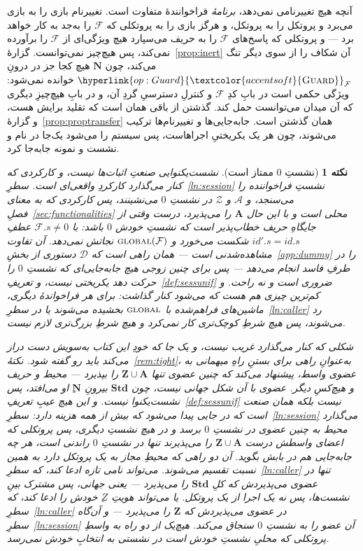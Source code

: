 \documentclass[10pt,oneside,openany]{book}
\newcommand{\admits}{\mathbf{N}}
\newcommand{\Apid}{\mathbf{A}}
\newcommand{\Zpid}{\mathbf{Z}}
\newcommand{\Stdpid}{\mathbf{Std}}
\newcommand{\F}{\mathcal{F}}
\newcommand{\Zenv}{\mathcal{Z}}
\newcommand{\Adv}{\mathcal{A}}
\newcommand{\Dum}{\mathcal{D}}
\newcommand{\op}[1]{\textnormal{\textsc{#1}}}
\newcommand{\opl}[1]{\hyperlink{op:#1}{\textcolor{accentsoft}{\op{#1}}}}
\newcommand{\id}{id}
\theoremstyle{accentdef}
\newtheorem{remark}[definition]{نکته}
\theoremstyle{accentplain}
\begin{document}
آنچه هیچ تغییرنامی نمی‌دهد، \emph{برنامهٔ} فراخوانندهٔ متفاوت است. تغییرنام
بازی را به بازی می‌برد و پروتکل را به پروتکل، و هرگز بازی را به پروتکلی که
$\F$ را به‌جد به کار خواهد برد --- و پروتکلی که پاسخ‌های $\F$ را به حریف
می‌سپارد هیچ ویژگی‌ای از $\F$ را برآورده نمی‌کند، پس هیچ‌چیز نمی‌توانست.
گزارهٔ~\ref{prop:inert} آن شکاف را از سوی دیگر تنگ می‌کند، چون $\admits$
هیچ کجا جز در درونِ $\opl{Guard}_{\F}$ خوانده نمی‌شود: ویژگی حکمی است در
بابِ کدِ $\F$ و کنترلِ دسترسیِ گردِ آن، و در بابِ هیچ‌چیزِ دیگری که آن میدان
می‌توانست حمل کند. گذشتن از باقی همان است که تقلید برایش هست، و
گزارهٔ~\ref{prop:proptransfer} همان گذشتن است. جابه‌جایی‌ها و تغییرنام‌ها
ترکیب می‌شوند، چون هر یک یکریختیِ اجراهاست، پس سیستم را می‌شود یک‌جا در
نام و نشست و نمونه جابه‌جا کرد.

\begin{remark}[نشستِ $0$ ممتاز است]\label{rem:sesszero}
نشست‌یکنوایی صنعتِ اثبات‌ها نیست، و کارکردی که کنار می‌گذارد کارکردِ
واقعی‌ای است. سطرِ~\ref{ln:session} نشستِ \emph{فراخواننده} را می‌سنجد، و
$\Adv$ و $\Zenv$ در نشستِ $0$ می‌نشینند، پس کارکردی که به معنای
فصلِ~\ref{sec:functionalities} \emph{محلی} است و با این حال $\Apid$ را
می‌پذیرد، درست وقتی از جایگاهِ حریف خطاب‌پذیر است که نشستِ خودش $0$ باشد: با
$\F.s \neq 0$ عطفِ $\id'.s = \id.s$ شکست می‌خورد و $\op{global}(\F)$
نجاتش نمی‌دهد. آن تفاوت مشاهده‌شدنی است --- همان راهی است که $\Dum$ دستوری
از بخشِ~\ref{app:dummy} را در طرفِ فاسد انجام می‌دهد --- پس برای چنین زوجی
هیچ جابه‌جایی‌ای که نشستِ $0$ را حرکت دهد یکریختی نیست، و
تعریفِ~\ref{def:sessunif} ضروری است و نه راحت. و کم‌ترین چیزی هم هست که
می‌شود کنار گذاشت: برای هر فراخواندهٔ دیگری، ماشین‌های فراهم‌شده با
$\op{global}$ بخشیده می‌شوند یا در سطرِ~\ref{ln:caller} رد می‌شوند، پس هیچ
شرطِ کوچک‌تری کار نمی‌کرد و هیچ شرطِ بزرگ‌تری لازم نیست.

شکلی که کنار می‌گذارد غریب نیست، و یک جا که خودِ این کتاب به‌سویش دست دراز
می‌کند باید رو گفته شود. نکتهٔ~\ref{rem:tight}، به‌عنوانِ راهی برای بستنِ
راهِ میهمانی به عضوی \emph{واسط}، پیشنهاد می‌کند که چنین عضوی تنها $\Zpid
\cup \Apid$ را بپذیرد --- محیط و حریف و هیچ‌کسِ دیگر. عضوی با آن شکل جهانی
نیست، چون $\Stdpid$ بیرونِ $\admits$ِ او می‌افتد، پس نشست‌یکنوا نیست. و این
هیچ عیبِ تعریفِ~\ref{def:sessunif} نیست بلکه همان صنعت است که در جایی
پیدا می‌شود که بیش از همه هزینه دارد: سطرِ~\ref{ln:session} می‌گذارد محیط
به چنین عضوی در نشستِ $0$ برسد و در هیچ نشستِ دیگری، پس پروتکلی که اعضای
واسطش درست $\Zpid \cup \Apid$ را می‌پذیرند تنها در نشستِ $0$ راندنی است، هر
چه جابه‌جایی هم در بابش بگوید. آن دو راهی که محیطِ مجاز به یک پروتکل دارد
به همین نسبت تقسیم می‌شوند. می‌تواند نامی تازه ادعا کند، که
سطرِ~\ref{ln:caller} تنها در عضوی می‌پذیردش که کلِ $\Stdpid$ را می‌پذیرد
--- یعنی جهانی، پس مشترک بینِ نشست‌ها، پس نه یک اجرا از یک پروتکل. یا
می‌تواند هویتِ $Z$ِ خودش را ادعا کند، که سطرِ~\ref{ln:caller} در عضوی
می‌پذیردش که $\Zpid$ را می‌پذیرد --- و آن‌گاه سطرِ~\ref{ln:session} آن عضو
را به نشستِ $0$ سنجاق می‌کند. هیچ‌یک از دو راه به واسطِ پروتکلی که محلیِ
نشستِ خودش است در نشستی به انتخابِ خودش نمی‌رسد.


\end{remark}
\end{document}
